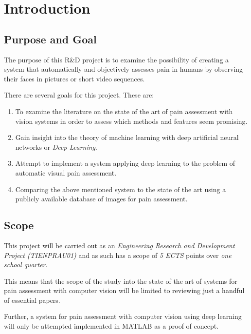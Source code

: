 \documentclass[Main]{subfiles}
\begin{document}
\section{Introduction} %
	\label{sec:introduction}

	\subsection{Purpose and Goal} %
		\label{sub:purpose_and_goal}
		The purpose of this R\&D project is to examine the possibility of creating a system that automatically and objectively  assesses pain in humans by observing their faces in pictures or short video sequences.

		There are several goals for this project.
		These are:
		\begin{enumerate}
			\item 
				To examine the literature on the state of the art of pain assessment with vision systems in order to assess which methods and features seem promising.
			\item
				Gain insight into the theory of machine learning with deep artificial neural networks or \emph{Deep Learning}.
			\item
				Attempt to implement a system applying deep learning to the problem of automatic visual pain assessment.
			\item 
				Comparing the above mentioned system to the state of the art using a publicly available database of images for pain assessment.
		\end{enumerate}


	\subsection{Scope} %
		\label{sub:scope}
		This project will be carried out as an \emph{Engineering Research and Development Project (TIENPRAU01)} and as such has a scope of \emph{5 ECTS} points over \emph{one school quarter}.

		This means that the scope of the study into the state of the art of systems for pain assessment with computer vision will be limited to reviewing just a handful of essential papers.

		Further, a system for pain assessment with computer vision using deep learning will only be attempted implemented in MATLAB as a proof of concept.


\end{document}
